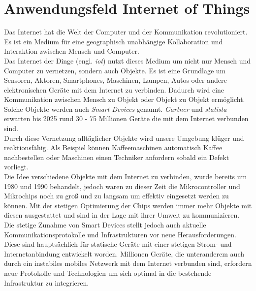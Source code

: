 \section{Anwendungsfeld Internet of Things} \label{s:domain}
Das Internet hat die Welt der Computer und der Kommunikation revolutioniert. Es ist ein Medium für eine geographisch unabhängige Kollaboration und Interaktion zwischen Mensch und Computer.
\cite{BriefHistoryInternet}
\\
Das Internet der Dinge (engl. \textit{\ac{iot}}) nutzt dieses Medium um nicht nur Mensch und Computer zu vernetzen, sondern auch Objekte. Es ist eine Grundlage um Sensoren, Aktoren, Smartphones, Maschinen, Lampen, Autos oder andere elektronischen Geräte mit dem Internet zu verbinden.
\cite{morganSimpleExplanationInternet}
Dadurch wird eine Kommunikation zwischen Mensch zu Objekt oder Objekt zu Objekt ermöglicht.
\cite{uckelmannArchitectingInternetThings2011}
Solche Objekte werden auch \textit{Smart Devices} genannt.
\textit{Gartner} \cite{hungGartnerInsightsHow} und \textit{statista} \cite{GlobalIoTNonIoT} erwarten bis 2025 rund 30 - 75 Millionen Geräte die mit dem Internet verbunden sind.
\\
Durch diese Vernetzung alltäglicher Objekte wird unsere Umgebung klüger und reaktionsfähig. Als Beispiel können Kaffeemaschinen automatisch Kaffee nachbestellen oder Maschinen einen Techniker anfordern sobald ein Defekt vorliegt.
\cite{rangerWhatIoTEverything}
\\
Die Idee verschiedene Objekte mit dem Internet zu verbinden, wurde bereits um 1980 und 1990 behandelt, jedoch waren zu dieser Zeit die Mikrocontroller und Mikrochips noch zu gro{\ss} und zu langsam um effektiv eingesetzt werden zu können.
Mit der stetigen Optimierung der Chips werden immer mehr Objekte mit diesen ausgestattet und sind in der Lage mit ihrer Umwelt zu kommunizieren.
\cite{rangerWhatIoTEverything}
\\
Die stetige Zunahme von Smart Devices stellt jedoch auch aktuelle Kommunikationsprotokolle und Infrastrukturen vor neue Herausforderungen.
Diese sind hauptsächlich für statische Geräte mit einer stetigen Strom- und Internetanbindung entwickelt worden. Millionen Geräte, die unteranderem auch durch ein instabiles mobiles Netzwerk mit dem Internet verbunden sind, erfordern neue Protokolle und Technologien um sich optimal in die bestehende Infrastruktur zu integrieren.
\cite{uckelmannArchitectingInternetThings2011}


